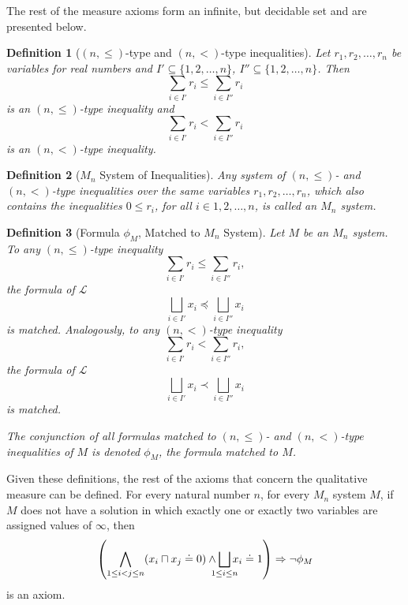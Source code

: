 \documentclass{article}
\newtheorem*{definition}{Definition}
\newcommand{\lang}{\mathcal{L}}
\newcommand{\lcap}{\sqcap}
\newcommand{\lparteq}{\doteq}
\newcommand{\lmeasure}{\preceq}
\newcommand{\lmeasures}{\prec}
\begin{document}
The rest of the measure axioms form an infinite, but decidable set and are presented below.
\begin{definition}[$(n, \leq)$-type and $(n, <)$-type inequalities]
  Let $r_1, r_2, \dots, r_n$ be variables for real numbers and $I' \subseteq \{1, 2, \dots, n\}$, $I'' \subseteq \{1, 2, \dots, n\}$. Then
  \begin{equation*}
    \sum_{i \in I'}r_i \leq \sum_{i \in I''}r_i
  \end{equation*}
  is an \emph{$(n, \leq)$-type inequality} and
  \begin{equation*}
    \sum_{i \in I'}r_i < \sum_{i \in I''}r_i
  \end{equation*}
  is an \emph{$(n, <)$-type inequality}.
\end{definition}
\begin{definition}[$M_n$ System of Inequalities]
  Any system of $(n, \leq)$- and $(n, <)$-type inequalities over the same variables $r_1, r_2, \dots, r_n$, which also contains the inequalities $0 \leq r_i$, for all $i \in {1, 2, \dots, n}$, is called an \emph{$M_n$ system}.
\end{definition}
\begin{definition}[Formula $\phi_M$, Matched to $M_n$ System]
  Let $M$ be an $M_n$ system. To any $(n, \leq)$-type inequality
  \begin{equation*}
    \sum_{i \in I'}r_i \leq \sum_{i \in I''}r_i,
  \end{equation*}
  the formula of $\lang$
  \begin{equation*}
    \bigsqcup_{i \in I'}x_i \lmeasure \bigsqcup_{i \in I''}x_i
  \end{equation*}
  is matched. Analogously, to any $(n, <)$-type inequality
  \begin{equation*}
    \sum_{i \in I'}r_i < \sum_{i \in I''}r_i,
  \end{equation*}
  the formula of $\lang$
  \begin{equation*}
    \bigsqcup_{i \in I'}x_i \lmeasures \bigsqcup_{i \in I''}x_i
  \end{equation*}
  is matched.

  The conjunction of all formulas matched to $(n, \leq)$- and $(n, <)$-type inequalities of $M$ is denoted $\phi_M$, the formula matched to $M$.
\end{definition}

Given these definitions, the rest of the axioms that concern the qualitative measure can be defined. For every natural number $n$, for every $M_n$ system $M$, if $M$ does not have a solution in which exactly one or exactly two variables are assigned values of $\infty$, then
\begin{equation*}
  \left(\bigwedge_{1 \leq i < j \leq n} (x_i \lcap x_j \lparteq 0) \land \bigsqcup_{\mathclap{1 \leq i \leq n}} x_i \lparteq 1\right) \Rightarrow \lnot \phi_M
\end{equation*}
is an axiom.
\end{document}
